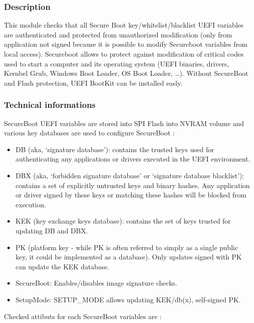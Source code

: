 \hypertarget{description-20}{%
\subsubsection{Description}\label{description-20}}

This module checks that all Secure Boot key/whitelist/blacklist UEFI
variables are authenticated and protected from unauthorized modification
(only from application not signed because it is possible to modify
Secureboot variables from local access). Secureboot allows to protect
against modification of critical codes used to start a computer and its
operating system (UEFI binaries, drivers, Kernbel Grub, Windows Boot
Loader, OS Boot Loader, \ldots). Without SecureBoot and Flash
protection, UEFI BootKit can be installed easly.

\hypertarget{technical-informations-19}{%
\subsubsection{Technical informations}\label{technical-informations-19}}

SecureBoot UEFI variables are stored into SPI Flash into NVRAM volume
and various key databases are used to configure SecureBoot :

\begin{itemize}
\tightlist
\item
  DB (aka, `signature database'): contains the trusted keys used for
  authenticating any applications or drivers executed in the UEFI
  environment.
\item
  DBX (aka, `forbidden signature database' or `signature database
  blacklist'): contains a set of explicitly untrusted keys and binary
  hashes. Any application or driver signed by these keys or matching
  these hashes will be blocked from execution.
\item
  KEK (key exchange keys database): contains the set of keys trusted for
  updating DB and DBX.
\item
  PK (platform key - while PK is often referred to simply as a single
  public key, it could be implemented as a database). Only updates
  signed with PK can update the KEK database.
\item
  SecureBoot: Enables/disables image signature checks.
\item
  SetupMode: SETUP\_MODE allows updating KEK/db(x), self-signed PK.
\end{itemize}

Checked attibuts for each SecureBoot variables are :

